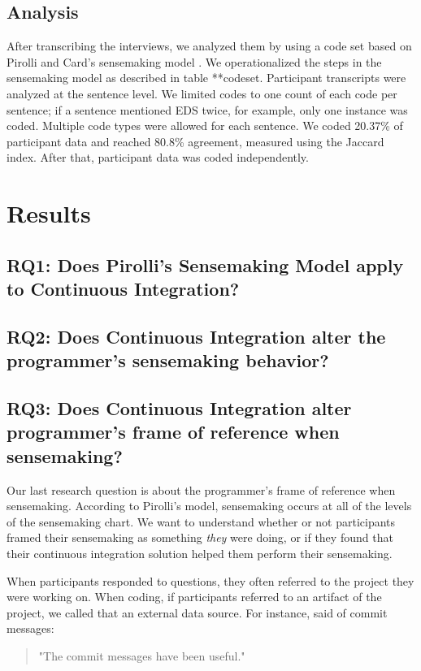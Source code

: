 \documentclass{sig-alternate-05-2015}
\begin{document}
\subsection{Analysis}
After transcribing the interviews, we analyzed them by using a code set based on Pirolli and Card's sensemaking model \cite{pirolli:sensemaking}. We operationalized the steps in the sensemaking model as described in table **codeset. Participant transcripts were analyzed at the sentence level. We limited codes to one count of each code per sentence; if a sentence mentioned EDS twice, for example, only one instance was coded. Multiple code types were allowed for each sentence. We coded 20.37\% of participant data and reached 80.8\% agreement, measured using the Jaccard index. After that, participant data was coded independently.

\section{Results}

\subsection{RQ1:  Does Pirolli's Sensemaking Model apply to Continuous Integration?}
\subsection{RQ2: Does Continuous Integration alter the programmer's sensemaking behavior?}
\subsection{RQ3: Does Continuous Integration alter programmer's frame of reference when sensemaking?}
Our last research question is about the programmer's frame of reference when sensemaking. According to Pirolli's model, sensemaking occurs at all of the levels of the sensemaking chart. We want to understand whether or not participants framed their sensemaking as something \textit{they} were doing, or if they found that their continuous integration solution helped them perform their sensemaking.

When participants responded to questions, they often referred to the project they were working on. When coding, if participants referred to an artifact of the project, we called that an external data source. For instance, \srutitwo  said of commit messages: 

\begin{quote}
"The commit messages have been  useful."
\end{quote}
\end{document}

